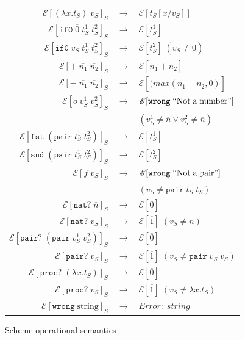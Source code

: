 \begin{figure}
\onehalfspacing
\begin{tabular}{rcl}
$\mathscr{E}[(\lambda x.t_{S})\;v_{S}]_{S}$ & $\rightarrow$ & $\mathscr{E}[t_{S}[x/v_{S}]]$ \\
$\mathscr{E}[\mathtt{if0}\;\overline{0}\;t_{S}^{1}\;t_{S}^{2}]_{S}$ & $\rightarrow$ & $\mathscr{E}[t_{S}^{1}]$ \\
$\mathscr{E}[\mathtt{if0}\;v_{S}\;t_{S}^{1}\;t_{S}^{2}]_{S}$ & $\rightarrow$ & $\mathscr{E}[t_{S}^{2}]\;(v_{S}\neq\overline{0})$ \\
$\mathscr{E}[+\;\overline{n_{1}}\;\overline{n_{2}}]_{S}$ & $\rightarrow$ & $\mathscr{E}[\overline{n_{1}+n_{2}}]$ \\
$\mathscr{E}[-\;\overline{n_{1}}\;\overline{n_{2}}]_{S}$ & $\rightarrow$ & $\mathscr{E}[\overline{(max(n_{1}-n_{2},0)}]$ \\
$\mathscr{E}[o\;v_{S}^{1}\;v_{S}^{2}]_{S}$ & $\rightarrow$ & $\mathscr{E}[\mathtt{wrong}\;\mathrm{``Not\;a\;number"}]$ \\
&& $(v_{S}^{1}\neq\overline{n}\vee v_{S}^{2}\neq\overline{n})$ \\
$\mathscr{E}[\mathtt{fst}\;(\mathtt{pair}\;t_{S}^{1}\;t_{S}^{2})]_{S}$ & $\rightarrow$ & $\mathscr{E}[t_{S}^{1}]$ \\
$\mathscr{E}[\mathtt{snd}\;(\mathtt{pair}\;t_{S}^{1}\;t_{S}^{2})]_{S}$ & $\rightarrow$ & $\mathscr{E}[t_{S}^{2}]$ \\
$\mathscr{E}[f\;v_{S}]_{S}$ & $\rightarrow$ & $\mathscr{E}[\mathtt{wrong}\;\mathrm{``Not\;a\;pair"}]$ \\
&& $(v_{S}\neq\mathtt{pair}\;t_{S}\;t_{S})$ \\
$\mathscr{E}[\mathtt{nat?}\;\overline{n}]_{S}$ & $\rightarrow$ & $\mathscr{E}[\overline{0}]$ \\
$\mathscr{E}[\mathtt{nat?}\;v_{S}]_{S}$ & $\rightarrow$ & $\mathscr{E}[\overline{1}]\;(v_{S}\neq\overline{n})$ \\
$\mathscr{E}[\mathtt{pair?}\;(\mathtt{pair}\;v_{S}^{1}\;v_{S}^{2})]_{S}$ & $\rightarrow$ & $\mathscr{E}[\overline{0}]$ \\
$\mathscr{E}[\mathtt{pair?}\;v_{S}]_{S}$ & $\rightarrow$ & $\mathscr{E}[\overline{1}]\;(v_{S}\neq\mathtt{pair}\;v_{S}\;v_{S})$ \\
$\mathscr{E}[\mathtt{proc?}\;(\lambda x.t_{S})]_{S}$ & $\rightarrow$ & $\mathscr{E}[\overline{0}]$ \\
$\mathscr{E}[\mathtt{proc?}\;v_{S}]_{S}$ & $\rightarrow$ & $\mathscr{E}[\overline{1}]\;(v_{S}\neq\lambda x.t_{S})$ \\
$\mathscr{E}[\mathtt{wrong}\;\mathrm{string}]_{S}$ & $\rightarrow$ & $Error:\;string$
\end{tabular}
\caption{Scheme operational semantics}
\label{fig:sos}
\end{figure}